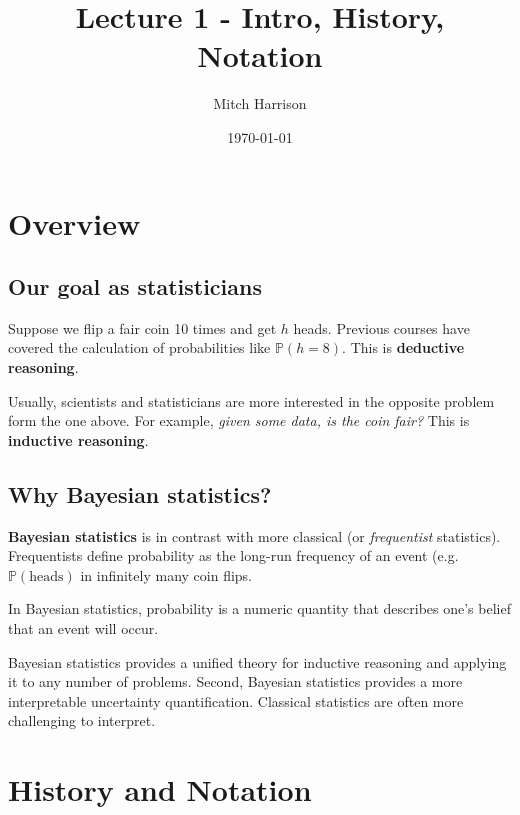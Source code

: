 \documentclass[titlepage, 12pt, leqno]{article}
\title{\Huge{Lecture 1 - Intro, History, Notation}}
\author{\large{Mitch Harrison}}
\date{\today}
\begin{document}
\setlength{\parskip}{1\baselineskip}
\setlength{\parindent}{15pt}
\maketitle
\tableofcontents
\newpage


\section{Overview}
\subsection{Our goal as statisticians}
\begin{definition}
    Suppose we flip a fair coin 10 times and get $h$ heads. Previous courses have 
    covered the calculation of probabilities like $\mathbb{P}(h=8)$. This is
    \textbf{deductive reasoning}.

    Usually, scientists and statisticians are more interested in the opposite 
    problem form the one above. For example, \textit{given some data, is the coin 
    fair?} This is \textbf{inductive reasoning}.
\end{definition}

\subsection{Why Bayesian statistics?}

\begin{definition}
    \textbf{Bayesian statistics} is in contrast with more classical (or
    \textit{frequentist} statistics). Frequentists define probability as the
    long-run frequency of an event (e.g. $\mathbb{P}( \text{heads})$ in 
    infinitely many coin flips.

    In Bayesian statistics, probability is a numeric quantity that describes
    one's belief that an event will occur.
\end{definition}

Bayesian statistics provides a unified theory for inductive reasoning and
applying it to any number of problems. Second, Bayesian statistics provides a
more interpretable uncertainty quantification. Classical statistics are often more
challenging to interpret.
    
\pagebreak
\section{History and Notation}
\end{document}
